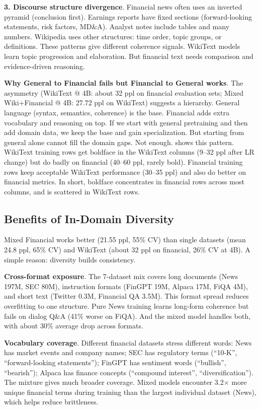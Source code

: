 \textbf{3. Discourse structure divergence}. Financial news often uses an inverted pyramid (conclusion first). Earnings reports have fixed sections (forward-looking statements, risk factors, MD\&A). Analyst notes include tables and many numbers. Wikipedia uses other structures: time order, topic groups, or definitions. These patterns give different coherence signals. WikiText models learn topic progression and elaboration. But financial text needs comparison and evidence-driven reasoning.

\textbf{Why General to Financial fails but Financial to General works}. The asymmetry (WikiText @ 4B: about 32 ppl on financial evaluation sets; Mixed Wiki+Financial @ 4B: 27.72 ppl on WikiText) suggests a hierarchy. General language (syntax, semantics, coherence) is the base. Financial adds extra vocabulary and reasoning on top. If we start with general pretraining and then add domain data, we keep the base and gain specialization. But starting from general alone cannot fill the domain gaps. Not enough.  shows this pattern. WikiText training rows get boldface in the WikiText columns (9--32 ppl after LR change) but do badly on financial (40--60 ppl, rarely bold). Financial training rows keep acceptable WikiText performance (30--35 ppl) and also do better on financial metrics. In short, boldface concentrates in financial rows across most columns, and is scattered in WikiText rows.

\subsection{Benefits of In-Domain Diversity}

Mixed Financial works better (21.55 ppl, 55\% CV) than single datasets (mean 24.8 ppl, 65\% CV) and WikiText (about 32 ppl on financial, 26\% CV at 4B). A simple reason: diversity builds consistency.

\textbf{Cross-format exposure}. The 7-dataset mix covers long documents (News 197M, SEC 80M), instruction formats (FinGPT 19M, Alpaca 17M, FiQA 4M), and short text (Twitter 0.3M, Financial QA 3.5M). This format spread reduces overfitting to one structure. Pure News training learns long-form coherence but fails on dialog Q\&A (41\% worse on FiQA). And the mixed model handles both, with about 30\% average drop across formats.

\textbf{Vocabulary coverage}. Different financial datasets stress different words: News has market events and company names; SEC has regulatory terms (``10-K'', ``forward-looking statements''); FinGPT has sentiment words (``bullish'', ``bearish''); Alpaca has finance concepts (``compound interest'', ``diversification''). The mixture gives much broader coverage. Mixed models encounter 3.2$\times$ more unique financial terms during training than the largest individual dataset (News), which helps reduce brittleness.


